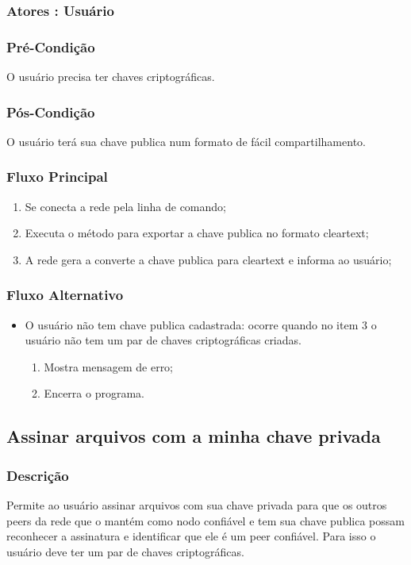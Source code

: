 \subsubsection{Atores : Usuário}
\subsubsection{Pré-Condição}
O usuário precisa ter chaves criptográficas.
\subsubsection{Pós-Condição}
O usuário terá sua chave publica num formato de fácil compartilhamento.
\subsubsection{Fluxo Principal}
\begin{enumerate}
    \item Se conecta a rede pela linha de comando;
    \item Executa o método para exportar a chave publica no formato cleartext;
    \item A rede gera a converte a chave publica para cleartext e informa ao usuário;
\end{enumerate}
\subsubsection{Fluxo Alternativo}
\begin{itemize}
    \item O usuário não tem chave publica cadastrada: ocorre quando no item 3 o usuário não tem um par de chaves criptográficas criadas.
    \begin{enumerate}
        \item Mostra mensagem de erro;
        \item Encerra o programa.
    \end{enumerate}
\end{itemize}


\subsection{Assinar arquivos com a minha chave privada}
\subsubsection{Descrição}
Permite ao usuário assinar arquivos com sua chave privada para que os outros peers da rede que o mantém como nodo confiável e tem sua chave publica possam reconhecer a assinatura e identificar que ele é um peer confiável. Para isso o usuário deve ter um par de chaves criptográficas.
